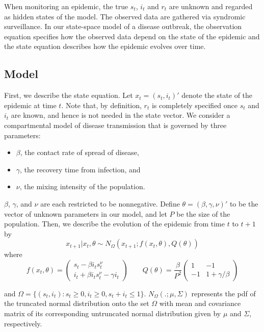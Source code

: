 \documentclass{elsarticle}
\begin{document}
When monitoring an epidemic, the true $s_t$, $i_t$ and $r_t$ are unknown and regarded as hidden states of the model. The observed data are gathered via syndromic surveillance. In our state-space model of a disease outbreak, the observation equation specifies how the observed data depend on the state of the epidemic and the state equation describes how the epidemic evolves over time.

\subsection{Model \label{sec:model}}

First, we describe the state equation. Let $x_t = (s_t,i_t)'$ denote the state of the epidemic at time $t$. Note that, by definition, $r_t$ is completely specified once $s_t$ and $i_t$ are known, and hence is not needed in the state vector. We consider a compartmental model of disease transmission that is governed by three parameters:

\begin{itemize}
\item $\beta$, the contact rate of spread of disease,
\item $\gamma$, the recovery time from infection, and
\item $\nu$, the mixing intensity of the population.
\end{itemize}

\noindent $\beta$, $\gamma$, and $\nu$ are each restricted to be nonnegative. Define $\theta = (\beta,\gamma,\nu)'$ to be the vector of unknown parameters in our model, and let $P$ be the size of the population. Then, we describe the evolution of the epidemic from time $t$ to $t + 1$ by
\begin{equation}
x_{t+1}\left|x_t,\theta\right. \sim N_\Omega\left(x_{t+1};f(x_t,\theta),Q(\theta)\right) \label{eqn:state}
\end{equation}
\noindent where
\[
f(x_t,\theta) = \left(
\begin{array}{c}
s_t - \beta i_ts^{\nu}_t \phantom{- \gamma i_t}\,\, \\
i_t +  \beta i_ts^\nu_t - \gamma i_t
\end{array}
\right)
\qquad
Q(\theta) = \frac{\beta}{P^2} \left(
\begin{array}{ccccc}
1 & -1 \\
-1 & 1 + \gamma/\beta
\end{array}
\right)
\]

\noindent and $\Omega = \{(s_t,i_t): s_t \ge 0, i_t \ge 0, s_t + i_t \le 1\}$. $N_{\Omega}(.; \mu,\Sigma)$ represents the pdf of the truncated normal distribution onto the set $\Omega$ with mean and covariance matrix of its corresponding untruncated normal distribution given by $\mu$ and $\Sigma$, respectively.
\end{document}
